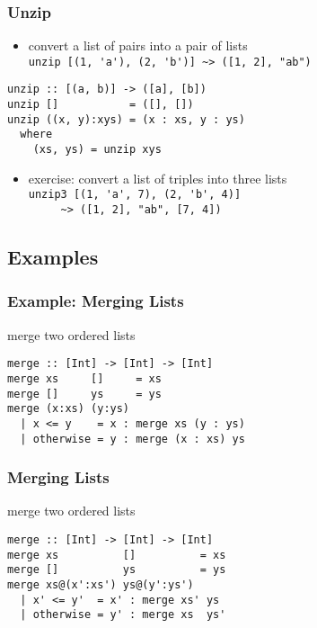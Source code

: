 \documentclass[dvipsnames]{beamer}
\theoremstyle{plain}
\begin{document}
\begin{frame}[fragile]
  \frametitle{Unzip}

  \begin{itemize}
    \item convert a list of pairs into a pair of lists\\
      \lstinline[style=exclamfix]|unzip [(1, 'a'), (2, 'b')] ~> ([1, 2], "ab")|
  \end{itemize}

  \begin{exampleblock}{}
    \begin{lstlisting}[deletekeywords={unzip}]
unzip :: [(a, b)] -> ([a], [b])
unzip []           = ([], [])
unzip ((x, y):xys) = (x : xs, y : ys)
  where
    (xs, ys) = unzip xys
    \end{lstlisting}
  \end{exampleblock}

  \pause
  \begin{itemize}
    \item exercise: convert a list of triples into three lists\\
      \lstinline[style=exclamfix]|unzip3 [(1, 'a', 7), (2, 'b', 4)]|\\
      \lstinline[style=exclamfix]|     ~> ([1, 2], "ab", [7, 4])|
  \end{itemize}
\end{frame}

\subsection{Examples}

\begin{frame}[fragile]
  \frametitle{Example: Merging Lists}

  \begin{exampleblock}{merge two ordered lists}
    \begin{lstlisting}
merge :: [Int] -> [Int] -> [Int]
merge xs     []     = xs
merge []     ys     = ys
merge (x:xs) (y:ys)
  | x <= y    = x : merge xs (y : ys)
  | otherwise = y : merge (x : xs) ys
    \end{lstlisting}
  \end{exampleblock}
\end{frame}

\begin{frame}[fragile]
  \frametitle{Merging Lists}

  \begin{exampleblock}{merge two ordered lists}
    \begin{lstlisting}
merge :: [Int] -> [Int] -> [Int]
merge xs          []          = xs
merge []          ys          = ys
merge xs@(x':xs') ys@(y':ys')
  | x' <= y'  = x' : merge xs' ys
  | otherwise = y' : merge xs  ys'
    \end{lstlisting}
  \end{exampleblock}
\end{frame}
\end{document}
